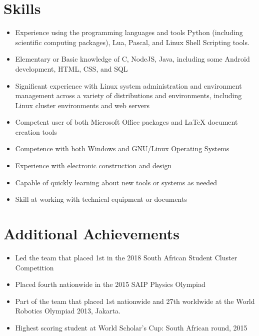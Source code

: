 \documentclass[12pt,a4paper,notitlepage]{article}
\begin{document}
\section*{Skills}
\begin{itemize}
	\setlength\itemsep{0.02em}
    \item Experience using the programming languages and tools Python (including scientific computing packages), Lua, Pascal, and Linux Shell Scripting tools.
    \item Elementary or Basic knowledge of C, NodeJS, Java, including some Android development, HTML, CSS, and SQL
    \item Significant experience with Linux system administration and environment management across a variety of distributions and environments, including Linux cluster environments and web servers
    \item Competent user of both Microsoft Office packages and LaTeX document creation tools
    \item Competence with both Windows and GNU/Linux Operating Systems
    \item Experience with electronic construction and design
    \item Capable of quickly learning about new tools or systems as needed
    \item Skill at working with technical equipment or documents
\end{itemize}

\section*{Additional Achievements}
\begin{itemize}
	\setlength\itemsep{0.02em}
    \item Led the team that placed 1st in the 2018 South African Student Cluster Competition
    \item Placed fourth nationwide in the 2015 SAIP Physics Olympiad
    \item Part of the team that placed 1st nationwide and 27th worldwide at the World Robotics Olympiad 2013, Jakarta.
    \item Highest scoring student at World Scholar's Cup: South African round, 2015
\end{itemize}
\end{document}
